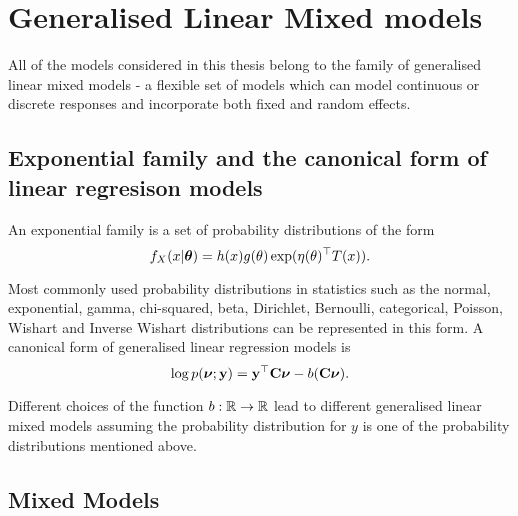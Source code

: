 \section{Generalised Linear Mixed models}
All of the models considered in this thesis belong to the family of generalised linear mixed models - a
flexible set of models which can model continuous or discrete responses and incorporate both fixed and
random effects.

\subsection{Exponential family and the canonical form of linear regresison models}

An exponential family is a set of probability distributions of the form
\[
	f_X(x|{\boldsymbol \theta}) = h(x) g(\theta) \exp(\eta(\theta)^\top T(x)).
\]

Most commonly used probability distributions in statistics such as the normal, exponential, gamma,
chi-squared, beta, Dirichlet, Bernoulli, categorical, Poisson, Wishart and Inverse Wishart distributions can
be represented in this form. A canonical form of generalised linear regression models is
\[
	\log p({\boldsymbol \nu}; {\bf y}) = {\bf y}^\top {\bf C} {\boldsymbol\nu} - b({\bf C} {\boldsymbol \nu}).
\]

Different choices of the function $b:{\mathbb{R}} \to {\mathbb{R}}$ lead to different generalised linear mixed models
assuming the probability distribution for $y$ is one of the probability distributions mentioned above.


\subsection{Mixed Models}

